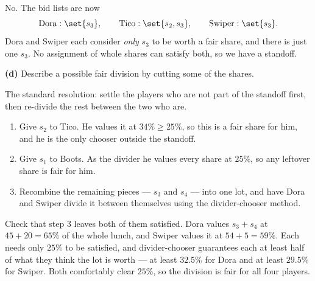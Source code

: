\documentclass[12pt]{ximera}
\begin{document}
\begin{problem}
\begin{prompt}
\begin{feedback}
No. The bid lists are now
\[
\text{Dora}: \set{s_3}, \qquad \text{Tico}: \set{s_2, s_3}, \qquad
\text{Swiper}: \set{s_3}.
\]
Dora and Swiper each consider \emph{only} $s_3$ to be worth a fair share, and there is
just one $s_3$. No assignment of whole shares can satisfy both, so we have a standoff.
\end{feedback}
\end{prompt}

\begin{prompt}
\textbf{(d)} Describe a possible fair division by cutting some of the shares.

\begin{freeResponse}
\end{freeResponse}

\begin{feedback}
The standard resolution: settle the players who are not part of the standoff first,
then re-divide the rest between the two who are.

\begin{enumerate}
\item Give $s_2$ to Tico. He values it at $34\% \ge 25\%$, so this is a fair share for
      him, and he is the only chooser outside the standoff.
\item Give $s_1$ to Boots. As the divider he values every share at $25\%$, so any
      leftover share is fair for him.
\item Recombine the remaining pieces --- $s_3$ and $s_4$ --- into one lot, and have
      Dora and Swiper divide it between themselves using the divider-chooser method.
\end{enumerate}

Check that step 3 leaves both of them satisfied. Dora values $s_3 + s_4$ at
$45+20 = 65\%$ of the whole lunch, and Swiper values it at $54+5 = 59\%$. Each needs
only $25\%$ to be satisfied, and divider-chooser guarantees each at least half of what
they think the lot is worth --- at least $32.5\%$ for Dora and at least $29.5\%$ for
Swiper. Both comfortably clear $25\%$, so the division is fair for all four players.
\end{feedback}
\end{prompt}
\end{problem}
\end{document}
